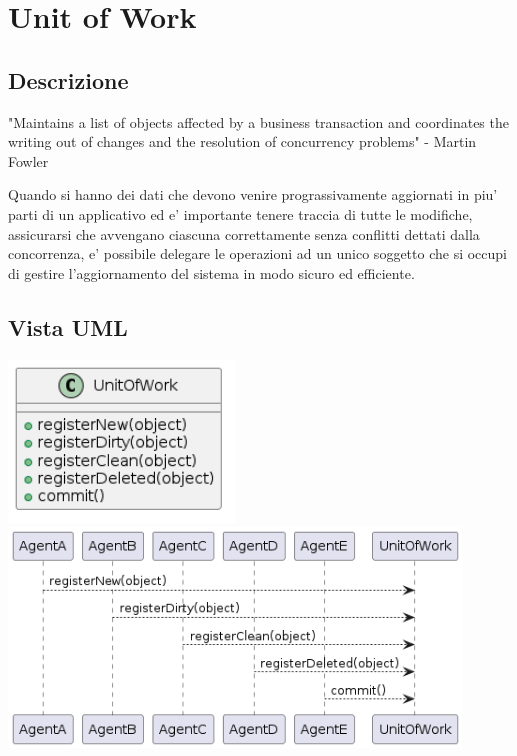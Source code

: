 \chapter{Unit of Work}

\section{Descrizione}

"Maintains a list of objects affected by a business transaction and coordinates the writing out of changes and the resolution of concurrency problems" - Martin Fowler

Quando si hanno dei dati che devono venire prograssivamente aggiornati in piu' parti di un applicativo ed e' importante tenere traccia di tutte le modifiche, assicurarsi che avvengano ciascuna correttamente senza conflitti dettati dalla concorrenza, e' possibile delegare le operazioni ad un unico soggetto che si occupi di gestire l'aggiornamento del sistema in modo sicuro ed efficiente.

\section{Vista UML}

\begin{center}
    \includegraphics[width=6cm]{images/unit-of-work/UnitOfWorkClass.png}
    \includegraphics[width=12cm]{images/unit-of-work/UnitOfWorkSD.png}
\end{center}

